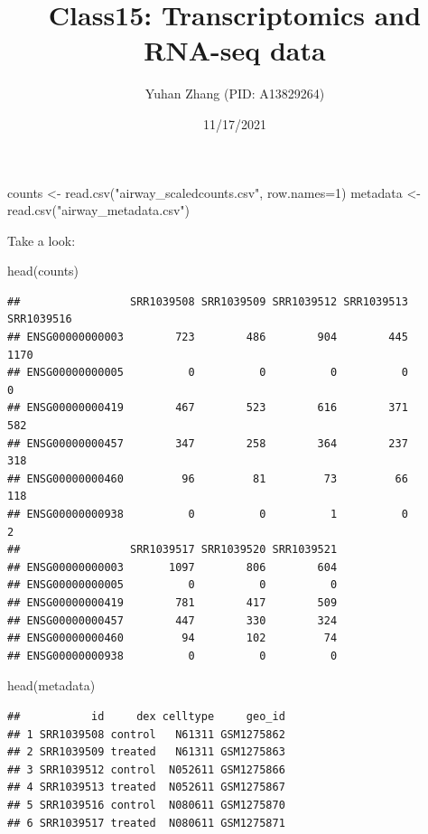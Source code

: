 \documentclass[
]{article}
\title{Class15: Transcriptomics and RNA-seq data}
\author{Yuhan Zhang (PID: A13829264)}
\date{11/17/2021}
\newenvironment{Shaded}{\begin{snugshade}}{\end{snugshade}}
\newcommand{\AttributeTok}[1]{\textcolor[rgb]{0.77,0.63,0.00}{#1}}
\newcommand{\DecValTok}[1]{\textcolor[rgb]{0.00,0.00,0.81}{#1}}
\newcommand{\FunctionTok}[1]{\textcolor[rgb]{0.00,0.00,0.00}{#1}}
\newcommand{\NormalTok}[1]{#1}
\newcommand{\OtherTok}[1]{\textcolor[rgb]{0.56,0.35,0.01}{#1}}
\newcommand{\StringTok}[1]{\textcolor[rgb]{0.31,0.60,0.02}{#1}}
\begin{document}
\maketitle

\begin{Shaded}
\begin{Highlighting}[]
\NormalTok{counts }\OtherTok{\textless{}{-}} \FunctionTok{read.csv}\NormalTok{(}\StringTok{"airway\_scaledcounts.csv"}\NormalTok{, }\AttributeTok{row.names=}\DecValTok{1}\NormalTok{)}
\NormalTok{metadata }\OtherTok{\textless{}{-}}  \FunctionTok{read.csv}\NormalTok{(}\StringTok{"airway\_metadata.csv"}\NormalTok{)}
\end{Highlighting}
\end{Shaded}

Take a look:

\begin{Shaded}
\begin{Highlighting}[]
\FunctionTok{head}\NormalTok{(counts)}
\end{Highlighting}
\end{Shaded}

\begin{verbatim}
##                 SRR1039508 SRR1039509 SRR1039512 SRR1039513 SRR1039516
## ENSG00000000003        723        486        904        445       1170
## ENSG00000000005          0          0          0          0          0
## ENSG00000000419        467        523        616        371        582
## ENSG00000000457        347        258        364        237        318
## ENSG00000000460         96         81         73         66        118
## ENSG00000000938          0          0          1          0          2
##                 SRR1039517 SRR1039520 SRR1039521
## ENSG00000000003       1097        806        604
## ENSG00000000005          0          0          0
## ENSG00000000419        781        417        509
## ENSG00000000457        447        330        324
## ENSG00000000460         94        102         74
## ENSG00000000938          0          0          0
\end{verbatim}

\begin{Shaded}
\begin{Highlighting}[]
\FunctionTok{head}\NormalTok{(metadata)}
\end{Highlighting}
\end{Shaded}

\begin{verbatim}
##           id     dex celltype     geo_id
## 1 SRR1039508 control   N61311 GSM1275862
## 2 SRR1039509 treated   N61311 GSM1275863
## 3 SRR1039512 control  N052611 GSM1275866
## 4 SRR1039513 treated  N052611 GSM1275867
## 5 SRR1039516 control  N080611 GSM1275870
## 6 SRR1039517 treated  N080611 GSM1275871
\end{verbatim}
\end{document}
